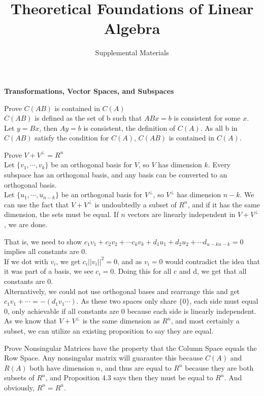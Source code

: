 \documentclass[12pt]{article}
\title{Theoretical Foundations of Linear Algebra}
\author{Supplemental Materials}
\begin{document}
\maketitle

\newtheorem{theorem}{Theorem}[section]
\newtheorem{proposition}[theorem]{Proposition}
\newtheorem{corollary}[theorem]{Corollary}


 \textbf{Transformations, Vector Spaces, and Subspaces}
 
 Prove $C(AB)$ is contained in $C(A)$\\
 $C(AB)$ is defined as the set of b such that $ABx=b$ is consistent for some $x$. Let $y=Bx$, then $Ay=b$ is consistent, the definition of $C(A)$. As all b in $C(AB)$ satisfy the condition for $C(A)$, $C(AB)$ is
contained in $C(A)$.

Prove $V + V^\perp = R^n$\\
Let $\{v_1,\cdots,v_k \}$ be an orthogonal basis for $V$, so $V$ has dimension $k$. Every subspace has an orthogonal basis, and any basis can be converted to an orthogonal basis.\\
Let $\{u_1,\cdots,u_{n-k}\}$ be an orthogonal basis for $V^\perp$, so $V^\perp$ has dimension $n-k$.
We can use the fact that $V+V^\perp$ is undoubtedly a subset of $R^n$, and if it has the same
dimension, the sets must be equal. If $n$ vectors are linearly independent in $V + V^ \perp$, we are
done.

That is, we need to show $c_1v_1+c_2v_2+ \cdots c_kv_k+d_1u_1+d_2u_2+ \cdots d_{u-kn-k} = 0$ implies all constants
are $0$.\\
If we dot with $v_i$, we get $c_i||v_i||^2 = 0$, and as $v_i=0$ would contradict the idea that it was part of a basis, we see $c_i = 0$. Doing this for all c and d, we get that all constants are $0$.\\
Alternatively, we could not use orthogonal bases and rearrange this and get \\
 $c_1v_1+ \cdots =-(d_1v_1 \cdots)$. As these two spaces only share $\{0\}$, each side must equal 0, only achievable if all constants are 0 because each side is linearly independent.\\
As we know that $V + V^\perp$ is the same dimension as $R^n$, and most certainly a subset, we can
utilize an existing proposition to say they are equal.

Prove Nonsingular Matrices have the property that the Column Space equals the Row Space.
Any nonsingular matrix will guarantee this because $C(A)$ and $R(A)$ both have dimension $n$, and
thus are equal to $R^n$ because they are both subsets of $R^n$, and Proposition 4.3 says then they must be equal to $R^n$. And obviously, $R^n = R^n$.
\end{document}
